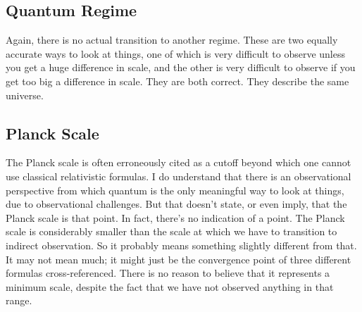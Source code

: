 \documentclass[twoside,twocolumn,9pt]{article}
\begin{document}
\subsection{Quantum Regime}
Again, there is no actual transition to another regime. These are two equally accurate ways to look at things, one of which is very difficult to observe unless you get a huge difference in scale, and the other is very difficult to observe if you get too big a difference in scale. They are both correct. They describe the same universe.

\subsection{Planck Scale}
The Planck scale is often erroneously cited as a cutoff beyond which one cannot use classical relativistic formulas. I do understand that there is an observational perspective from which quantum is the only meaningful way to look at things, due to observational challenges. But that doesn't state, or even imply, that the Planck scale is that point. In fact, there's no indication of a point. The Planck scale is considerably smaller than the scale at which we have to transition to indirect observation. So it probably means something slightly different from that. It may not mean much; it might just be the convergence point of three different formulas cross-referenced. There is no reason to believe that it represents a minimum scale, despite the fact that we have not observed anything in that range.

\balance
\clearpage
\end{document}

